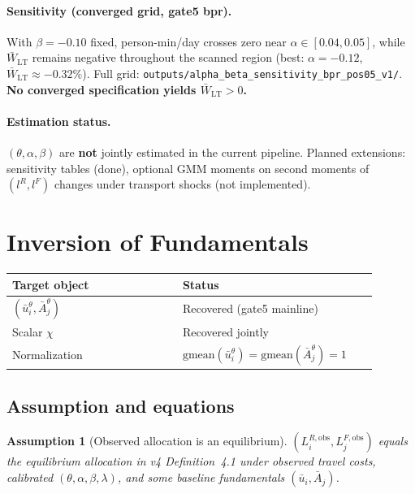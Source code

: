 \documentclass[11pt]{article}
\newtheorem{assumption}{Assumption}
\newcommand{\Wbar}{\bar W}
\newcommand{\ubar}{\bar u}
\newcommand{\Abar}{\bar A}
\newcommand{\obs}{\mathrm{obs}}
\begin{document}
\paragraph{Sensitivity (converged grid, gate5 bpr).}
With $\beta=-0.10$ fixed, person-min/day crosses zero near
$\alpha\in[0.04,0.05]$, while $\Wbar_{\mathrm{LT}}$ remains negative
throughout the scanned region (best: $\alpha=-0.12$, $\Wbar_{\mathrm{LT}}\approx -0.32\%$).
Full grid:
\texttt{outputs/alpha\_beta\_sensitivity\_bpr\_pos05\_v1/}.
\textbf{No converged specification yields $\Wbar_{\mathrm{LT}}>0$.}

\paragraph{Estimation status.}
$(\theta,\alpha,\beta)$ are \textbf{not} jointly estimated in the
current pipeline.  Planned extensions: sensitivity tables (done),
optional GMM moments on second moments of $(l^R,l^F)$ changes under
transport shocks (not implemented).

\section{Inversion of Fundamentals}\label{sec:invert}

\begin{longtable}{@{}p{0.42\linewidth}p{0.48\linewidth}@{}}
\toprule
\textbf{Target object} & \textbf{Status} \\
\midrule
\endhead
$(\ubar_i^{\theta},\Abar_j^{\theta})$ & Recovered (gate5 mainline) \\
Scalar $\chi$ & Recovered jointly \\
Normalization & $\mathrm{gmean}(\ubar_i^{\theta})=\mathrm{gmean}(\Abar_j^{\theta})=1$ \\
\bottomrule
\end{longtable}

\subsection{Assumption and equations}

\begin{assumption}[Observed allocation is an equilibrium]\label{ass:obs_eq}
$(L_i^{R,\obs},L_j^{F,\obs})$ equals the equilibrium allocation in
v4 Definition~4.1 under observed travel costs, calibrated
$(\theta,\alpha,\beta,\lambda)$, and some baseline fundamentals
$(\ubar_i,\Abar_j)$.
\end{assumption}
\end{document}
